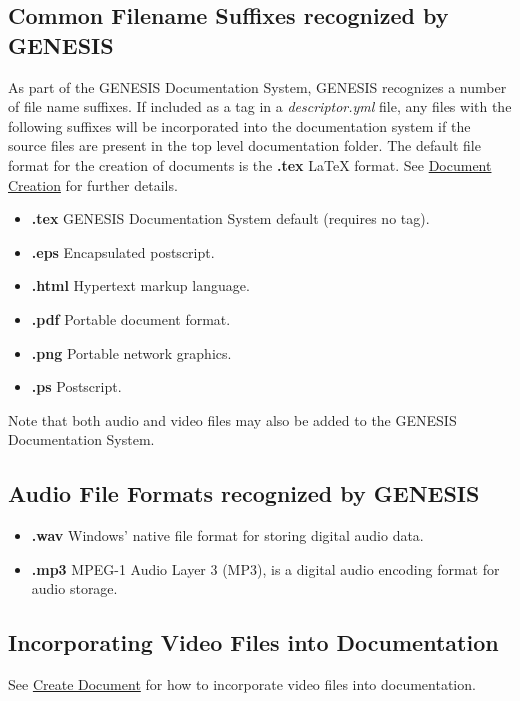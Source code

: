 \documentclass[12pt]{article}
\begin{document}
\subsection*{Common Filename Suffixes recognized by GENESIS}
As part of the GENESIS Documentation System, GENESIS recognizes a number of file name suffixes. If included as a tag in a {\it descriptor.yml} file, any files with the following suffixes will be incorporated into the documentation system if the source files are present in the top level documentation folder. The default file format for the creation of documents is the {\bf .tex} \LaTeX\,\,format. See \href{../document-create/document-create.tex}{Document Creation} for further details.

\begin{itemize}

\item[]{\bf .tex} GENESIS Documentation System default (requires no tag).
\item[]{\bf .eps} Encapsulated postscript.
\item[]{\bf .html} Hypertext markup language.
\item[]{\bf .pdf} Portable document format.
\item[]{\bf .png} Portable network graphics.
\item[]{\bf .ps} Postscript.

\end{itemize}
Note that both audio and video files may also be added to the GENESIS Documentation System.

\subsection*{Audio File Formats recognized by GENESIS}

\begin{itemize}

\item[]{\bf .wav} Windows' native file format for storing digital audio data.
\item[]{\bf .mp3} MPEG-1 Audio Layer 3 (MP3), is a digital audio encoding format for audio storage.

\end{itemize}

\subsection*{Incorporating Video Files into Documentation}

See \href{../document-create/document-create.tex}{Create Document} for how to incorporate video files into documentation.
\end{document}
